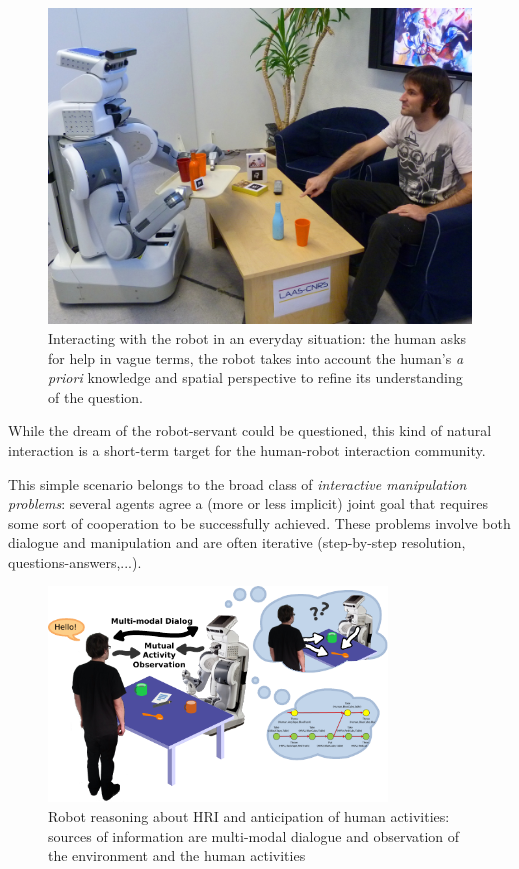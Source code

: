 \documentclass{svmult}
\begin{document}
\begin{figure}%
	\centering
	\includegraphics[width=0.8\linewidth]{figs/aperitif_time.jpg} 

	\caption{Interacting with the robot in an everyday situation: the human
	asks for help in vague terms, the robot takes into account the human's {\it
	a priori} knowledge and spatial perspective to refine its understanding of
	the question.} 

	\label{fig|vpt} 
\end{figure}

While the dream of the robot-servant could be questioned, this kind of natural
interaction is a short-term target for the human-robot interaction community.

This simple scenario belongs to the broad class of \emph{interactive
manipulation problems}: several agents agree a (more or less implicit) joint
goal that requires some sort of cooperation to be successfully achieved. These
problems involve both dialogue and manipulation and are often iterative
(step-by-step resolution, questions-answers,...).


\begin{figure}[htb]
\centering
\includegraphics[width=9cm]{figs/grounding_robot.pdf}
\caption{Robot reasoning about HRI and anticipation of human activities:
  sources of information are multi-modal dialogue and observation of
  the environment and the human activities}
\label{fig|hri-dec}
\end{figure}
\end{document}

